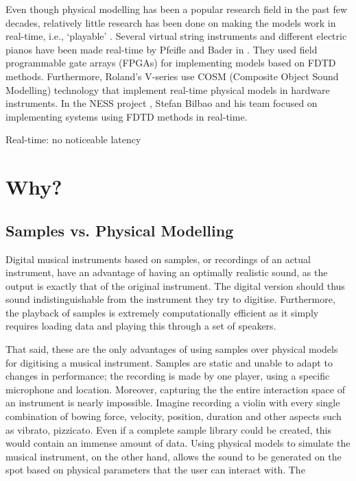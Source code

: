 Even though physical modelling has been a popular research field in the past few decades, relatively little research has been done on making the models work in real-time, i.e., `playable’ \cite{Mehes2016}. Several virtual string instruments and different electric pianos have been made real-time by Pfeifle and Bader in \cite{Pfeifle2012, Pfeifle2015, Pfeifle2017}. They used field programmable gate arrays (FPGAs) for implementing models based on FDTD methods. Furthermore, Roland’s V-series use COSM (Composite Object Sound Modelling) technology \cite{Bybee2019} that implement real-time physical models in hardware instruments. In the NESS project \cite{Bilbao2019CMJa,Bilbao2019CMJb}, Stefan Bilbao and his team focused on implementing systems using FDTD methods in real-time.

Real-time: no noticeable latency

\section{Why?}

\subsection{Samples vs. Physical Modelling} 
Digital musical instruments based on samples, or recordings of an actual instrument, have an advantage of having an optimally realistic sound, as the output is exactly that of the original instrument. The digital version should thus sound indistinguishable from the instrument they try to digitise. Furthermore, the playback of samples is extremely computationally efficient as it simply requires loading data and playing this through a set of speakers.

That said, these are the only advantages of using samples over physical models for digitising a musical instrument. Samples are static and unable to adapt to changes in performance; the recording is made by one player, using a specific microphone and location. Moreover, capturing the the entire interaction space of an instrument is nearly impossible. Imagine recording a violin with every single combination of bowing force, velocity, position, duration and other aspects such as vibrato, pizzicato. Even if a complete sample library could be created, this would contain an immense amount of data. Using physical models to simulate the musical instrument, on the other hand, allows the sound to be generated on the spot based on physical parameters that the user can interact with. The 

